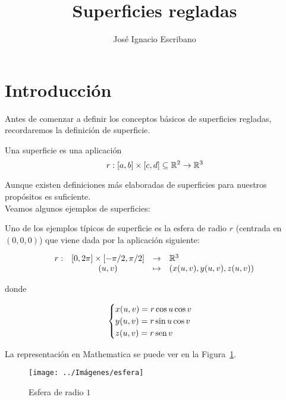 \documentclass[10pt,a4paper]{article}
\author{José Ignacio Escribano}
\title{Superficies regladas}
\begin{document}
	


\tableofcontents
\newpage

\listoffigures
\newpage

\pagestyle{plain}

\section{Introducción}

Antes de comenzar a definir los conceptos básicos de superficies regladas, recordaremos la definición de superficie.

\begin{defi}
	Una superficie es una aplicación
	\begin{equation}
	r : [a,b] \times [c,d] \subseteq \mathbb{R}^2 \to \mathbb{R}^3
	\end{equation}
\end{defi}

Aunque existen definiciones más elaboradas de superficies para nuestros propósitos es suficiente.\\

Veamos algunos ejemplos de superficies:

\begin{ejemplo}[Esfera]
Uno de los ejemplos típicos de superficie es la esfera de radio $r$ (centrada en $(0,0,0)$) que viene dada por la aplicación siguiente:

$$\begin{array}{rcll}
	r : & [0, 2\pi] \times [-\pi/2, \pi/2] & \to & \mathbb{R}^3\\
		& (u,v) & \mapsto & (x(u,v), y(u,v), z(u,v))
\end{array}$$
		
donde 

$$\begin{cases}
x(u,v) = r\cos u \cos v \\
y(u,v) = r\sin u \cos v \\
z(u,v) = r\mathop{\mbox{\normalfont sen}}\nolimits v
\end{cases}$$

La representación en Mathematica se puede ver en la Figura~\ref{fig:esfera}.

\begin{figure}[thbp]
	\centering
	\texttt{[image: ../Imágenes/esfera]}
	\caption{Esfera de radio $1$}
	\label{fig:esfera}
\end{figure}

\end{ejemplo}
\end{document}

